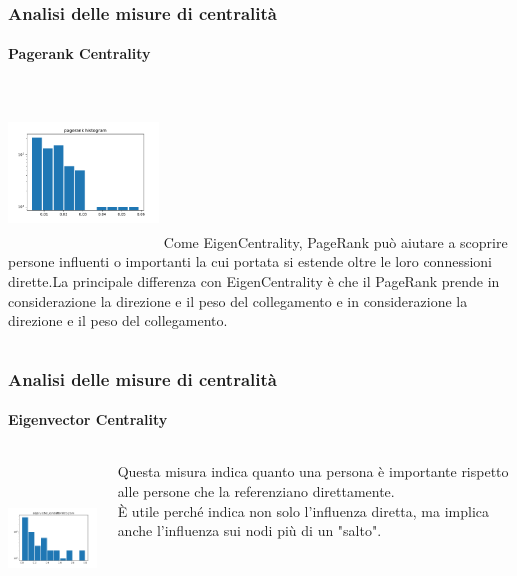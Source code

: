 \documentclass[hyperref={pdfpagelabels=false}]{beamer}
\begin{document}
\begin{frame}
\frametitle{Analisi delle misure di centralità}
\framesubtitle{Pagerank Centrality}
\begin{columns}
             \centering
             \includegraphics[height=4cm, 
             width=4cm]{images/centrality_measures/pagerank.pdf}
       Come EigenCentrality, PageRank può aiutare a scoprire persone influenti o importanti la cui portata si estende oltre le loro connessioni dirette.La principale differenza con EigenCentrality è che il PageRank prende in considerazione la direzione e il peso del collegamento e in considerazione la direzione e il peso del collegamento.
         \end{columns} 

\end{frame}


\begin{frame}
\frametitle{Analisi delle misure di centralità}
\framesubtitle{Eigenvector Centrality}
\begin{columns}
             \centering
             \includegraphics[height=4cm, 
             width=4cm]{images/centrality_measures/eigenvector_centrality.pdf}
             
            Questa misura indica quanto una persona è importante rispetto alle persone che la referenziano direttamente. \\
            È utile perché indica non solo l'influenza diretta, ma implica anche l'influenza sui nodi più di un "salto".
         \end{columns} 

\end{frame}
\end{document}
